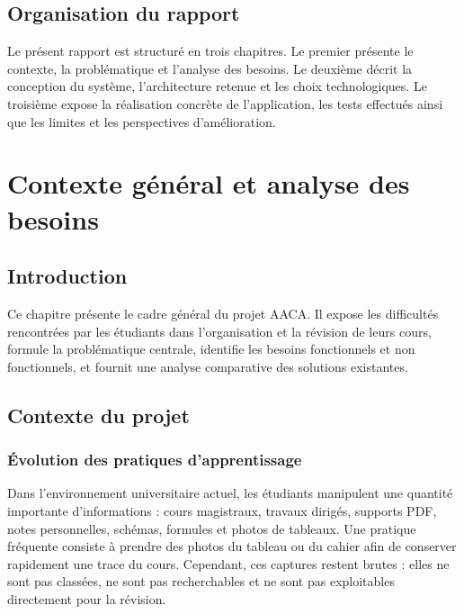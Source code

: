 \documentclass[12pt,a4paper]{report}
\begin{document}
\section*{Organisation du rapport}

Le présent rapport est structuré en trois chapitres. Le premier présente le contexte, la problématique et l'analyse des besoins. Le deuxième décrit la conception du système, l'architecture retenue et les choix technologiques. Le troisième expose la réalisation concrète de l'application, les tests effectués ainsi que les limites et les perspectives d'amélioration.

\chapter{Contexte général et analyse des besoins}

\section{Introduction}

Ce chapitre présente le cadre général du projet AACA. Il expose les difficultés rencontrées par les étudiants dans l'organisation et la révision de leurs cours, formule la problématique centrale, identifie les besoins fonctionnels et non fonctionnels, et fournit une analyse comparative des solutions existantes.

\section{Contexte du projet}

\subsection{Évolution des pratiques d'apprentissage}

Dans l'environnement universitaire actuel, les étudiants manipulent une quantité importante d'informations : cours magistraux, travaux dirigés, supports PDF, notes personnelles, schémas, formules et photos de tableaux. Une pratique fréquente consiste à prendre des photos du tableau ou du cahier afin de conserver rapidement une trace du cours. Cependant, ces captures restent brutes : elles ne sont pas classées, ne sont pas recherchables et ne sont pas exploitables directement pour la révision.
\end{document}
